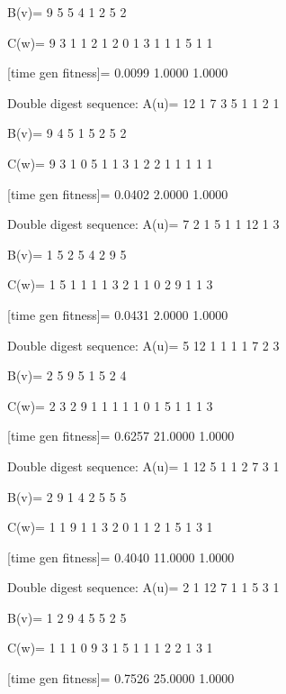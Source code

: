 B(v)=
     9     5     5     4     1     2     5     2

C(w)=
     9     3     1     1     2     1     2     0     1     3     1     1     1     5     1     1

[time gen fitness]=
    0.0099    1.0000    1.0000

Double digest sequence:
A(u)=
    12     1     7     3     5     1     1     2     1

B(v)=
     9     4     5     1     5     2     5     2

C(w)=
     9     3     1     0     5     1     1     3     1     2     2     1     1     1     1     1

[time gen fitness]=
    0.0402    2.0000    1.0000

Double digest sequence:
A(u)=
     7     2     1     5     1     1    12     1     3

B(v)=
     1     5     2     5     4     2     9     5

C(w)=
     1     5     1     1     1     1     3     2     1     1     0     2     9     1     1     3

[time gen fitness]=
    0.0431    2.0000    1.0000

Double digest sequence:
A(u)=
     5    12     1     1     1     1     7     2     3

B(v)=
     2     5     9     5     1     5     2     4

C(w)=
     2     3     2     9     1     1     1     1     1     0     1     5     1     1     1     3

[time gen fitness]=
    0.6257   21.0000    1.0000

Double digest sequence:
A(u)=
     1    12     5     1     1     2     7     3     1

B(v)=
     2     9     1     4     2     5     5     5

C(w)=
     1     1     9     1     1     3     2     0     1     1     2     1     5     1     3     1

[time gen fitness]=
    0.4040   11.0000    1.0000

Double digest sequence:
A(u)=
     2     1    12     7     1     1     5     3     1

B(v)=
     1     2     9     4     5     5     2     5

C(w)=
     1     1     1     0     9     3     1     5     1     1     1     2     2     1     3     1

[time gen fitness]=
    0.7526   25.0000    1.0000

